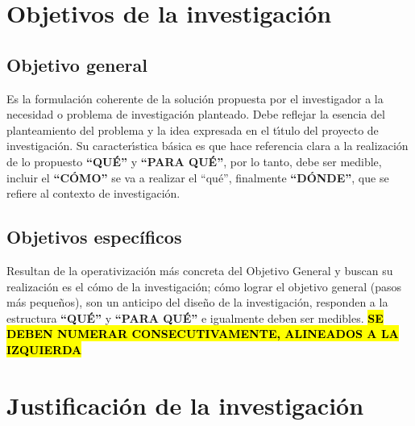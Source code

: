 \section{Objetivos de la investigaci\'on}
\label{cap0:sec:objetivos_de_la_investigacion}

\subsection{Objetivo general}
\label{cap0:sub:objetivo_general}

Es la formulaci\'{o}n coherente de la soluci\'{o}n propuesta por el investigador a la necesidad o 
problema de investigaci\'{o}n planteado. Debe reflejar la esencia del planteamiento del problema y 
la idea expresada en el t\'{\i}tulo del proyecto de investigaci\'{o}n. Su caracter\'{\i}stica 
b\'{a}sica es que hace referencia clara a la realizaci\'{o}n de lo propuesto \textbf{``QU\'{E}''} y 
\textbf{``PARA QU\'{E}''}, por lo tanto, debe ser medible, incluir el \textbf{``C\'{O}MO''} se va 
a realizar el ``qu\'{e}'', finalmente \textbf{``D\'{O}NDE''}, que se refiere al contexto de 
investigaci\'{o}n. 


\subsection{Objetivos espec\'ificos}
\label{cap0:sub:objetivos_especificos}

Resultan de la operativizaci\'{o}n m\'{a}s concreta del Objetivo General y buscan su realizaci\'{o}n 
es el c\'{o}mo de la investigaci\'{o}n; c\'{o}mo lograr el objetivo general (pasos m\'{a}s 
peque\~{n}os), son un anticipo del dise\~{n}o de la investigaci\'{o}n, responden a la estructura
\textbf{``QU\'{E}''} y \textbf{``PARA QU\'{E}''} e igualmente deben ser medibles. 
\hl{\textbf{SE DEBEN NUMERAR CONSECUTIVAMENTE, ALINEADOS A LA IZQUIERDA}}



\section{Justificaci\'on de la investigaci\'on }
\label{cap0:sec:justificacion_de_la_investigacion}

